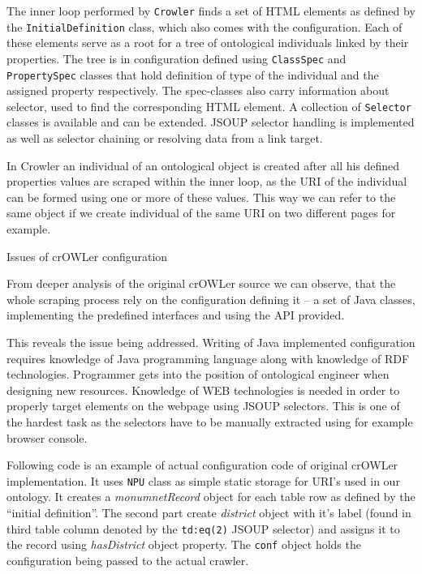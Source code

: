 The inner loop performed by {\tt Crowler} finds a set of HTML elements as
defined by the {\tt InitialDefinition} class, which also comes with the
configuration. Each of these elements serve as a root for a tree of ontological
individuals linked by their properties. The tree is in configuration defined
using {\tt ClassSpec} and {\tt PropertySpec} classes that hold definition of
type of the individual and the assigned property respectively. The spec-classes
also carry information about selector, used to find the corresponding HTML element. 
A collection of {\tt Selector} classes is available and can be extended.  JSOUP
selector handling is implemented as well as selector chaining or resolving data
from a link target. 

In Crowler an individual of an ontological object is created after all his
defined properties values are scraped within the inner loop, as the URI of the
individual can be formed using one or more of these values. This way we can
refer to the same object if we create individual of the same URI on two
different pages for example. 


\secc Issues of crOWLer configuration

From deeper analysis of the original crOWLer source we can observe, that the
whole scraping process rely on the configuration defining it -- a set of Java
classes, implementing the predefined interfaces and using the API provided.

This reveals the issue being addressed. Writing of Java implemented
configuration requires knowledge of Java programming language along with
knowledge of RDF technologies. Programmer gets into the position of ontological
engineer when designing new resources. Knowledge of WEB technologies is needed
in order to properly target elements on the webpage using JSOUP selectors. This
is one of the hardest task as the selectors have to be manually extracted using
for example browser console. 

Following code is an example of actual configuration code of original crOWLer
implementation. It uses {\tt NPU} class as simple static storage for URI's
used in our ontology. It creates a {\em monumnetRecord} object for each table
row as defined by the ``initial definition''. The second part create {\em
district} object with it's label (found in third table column denoted by the
{\tt td:eq(2)} JSOUP selector) and assigns it to the record using {\em
hasDistrict} object property. The {\tt conf} object holds the configuration
being passed to the actual crawler. 


